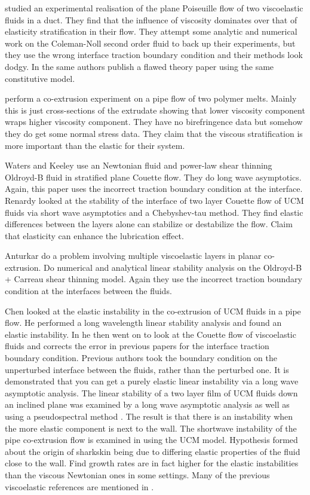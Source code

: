 \documentclass{jfm}
\begin{document}
\citet{Khan1976} studied an experimental realisation of the plane Poiseuille
flow of two viscoelastic fluids in a duct. They find that the influence of
viscosity dominates over that of elasticity stratification in their flow. They
attempt some analytic and numerical work on the Coleman-Noll second order fluid
to back up their experiments, but they use the wrong interface traction
boundary condition and their methods look dodgy. In \citet{Khan1977} the same
authors publish a flawed theory paper using the same constitutive model.

\citet{Han1985} perform a co-extrusion experiment on a pipe flow of two polymer
melts. Mainly this is just cross-sections of the extrudate showing that lower
viscosity component wraps higher viscosity component. They have no
birefringence data but somehow they do get some normal stress data. They claim
that the viscous stratification is more important than the elastic for their
system.

Waters and Keeley \citep{Waters1987} use an Newtonian fluid and power-law shear
thinning Oldroyd-B fluid in stratified plane Couette flow. They do long wave
asymptotics. Again, this paper uses the incorrect traction boundary condition
at the interface.  Renardy \citep{Renardy1988} looked at the stability of the
interface of two layer Couette flow of UCM fluids via short wave asymptotics
and a Chebyshev-tau method. They find elastic differences between the layers
alone can stabilize or destabilize the flow. Claim that elasticity can enhance
the lubrication effect. 

Anturkar \citep{Anturkar1990} do a problem involving multiple viscoelastic
layers in planar co-extrusion. Do numerical and analytical linear stability
analysis on the Oldroyd-B + Carreau shear thinning model.  Again they use the
incorrect traction boundary condition at the interfaces between the fluids.

Chen \citep{Chen1991a} looked at the elastic instability in the co-extrusion of
UCM fluids in a pipe flow. He performed a long wavelength linear stability
analysis and found an elastic instability. In \citep{Chen1991b} he then went on
to look at the Couette flow of viscoelastic fluids and corrects the error in
previous papers \citep{Li1969, Waters1987, Anturkar1990} for the interface
traction boundary condition. Previous authors took the boundary condition on
the unperturbed interface between the fluids, rather than the perturbed one.
It is demonstrated that you can get a purely elastic linear instability via a
long wave asymptotic analysis. The linear stability of a two layer film of UCM
fluids down an inclined plane was examined by a long wave asymptotic analysis
as well as using a pseudospectral method \citep{Chen1992a}. The result is that
there is an instability when the more elastic component is next to the wall.
The shortwave instability of the pipe co-extrusion flow is examined in
\citep{Chen1992b} using the UCM model. Hypothesis formed about the origin of
sharkskin being due to differing elastic properties of the fluid close to the
wall.  Find growth rates are in fact higher for the elastic instabilities than
the viscous Newtonian ones in some settings. Many of the previous viscoelastic
references are mentioned in \citep{Larson1992}.
\end{document}
